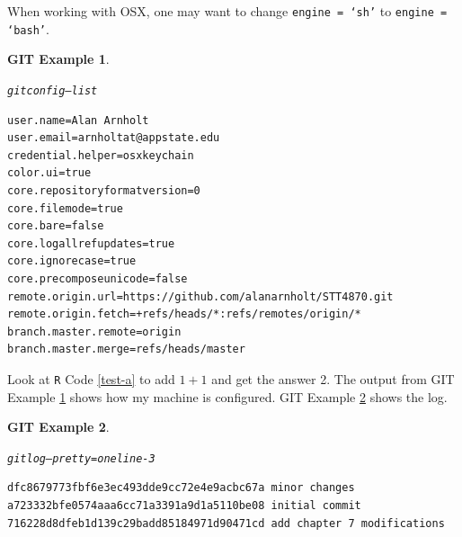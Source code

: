 \documentclass{article}\usepackage[]{graphicx}\usepackage[]{color}
\makeatletter
\newenvironment{kframe}{%
 \def\at@end@of@kframe{}%
 \ifinner\ifhmode%
  \def\at@end@of@kframe{\end{minipage}}%
  \begin{minipage}{\columnwidth}%
 \fi\fi%
 \def\FrameCommand##1{\hskip\@totalleftmargin \hskip-\fboxsep
 \colorbox{shadecolor}{##1}\hskip-\fboxsep
     \hskip-\linewidth \hskip-\@totalleftmargin \hskip\columnwidth}%
 \MakeFramed {\advance\hsize-\width
   \@totalleftmargin\z@ \linewidth\hsize
   \@setminipage}}%
 {\par\unskip\endMakeFramed%
 \at@end@of@kframe}
\newenvironment{knitrout}{}{} %
\theoremstyle{rcode}
\newtheorem{GIT}{GIT Example}[section]
\makeatother
\begin{document}
When working with OSX, one may want to change \texttt{engine = `sh'} to \texttt{engine = `bash'}.

\begin{knitrout}
\color{fgcolor}\begin{kframe}
\begin{GIT}\label{GITlabel}\hfill{}\begin{alltt}
git config --list
\end{alltt}

\begin{verbatim}
user.name=Alan Arnholt
user.email=arnholtat@appstate.edu
credential.helper=osxkeychain
color.ui=true
core.repositoryformatversion=0
core.filemode=true
core.bare=false
core.logallrefupdates=true
core.ignorecase=true
core.precomposeunicode=false
remote.origin.url=https://github.com/alanarnholt/STT4870.git
remote.origin.fetch=+refs/heads/*:refs/remotes/origin/*
branch.master.remote=origin
branch.master.merge=refs/heads/master
\end{verbatim}
\end{GIT}\end{kframe}
\end{knitrout}


Look at \texttt{R} Code \ref{test-a} to add $1 + 1$ and get the answer 2. The output from GIT Example \ref{GITlabel} shows how my machine is configured. GIT Example \ref{gitlog} shows the log.

\begin{knitrout}
\color{fgcolor}\begin{kframe}
\begin{GIT}\label{gitlog}\hfill{}\begin{alltt}
git log --pretty=oneline -3
\end{alltt}

\begin{verbatim}
dfc8679773fbf6e3ec493dde9cc72e4e9acbc67a minor changes
a723332bfe0574aaa6cc71a3391a9d1a5110be08 initial commit
716228d8dfeb1d139c29badd85184971d90471cd add chapter 7 modifications
\end{verbatim}
\end{GIT}\end{kframe}
\end{knitrout}
\end{document}

